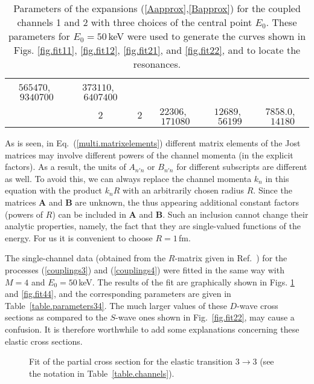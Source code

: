 \documentclass[12pt]{article}
\begin{document}
\begin{table}
\begin{center}
\begin{tabular}{|c|c|c|c|c|c|}
$565470$,\  $9340700$ &
$         373110$,\   $         6407400$\\
  & 2 & 2 &
$          22306    $,\   $         171080$ & %
$12689$,\  $56199$ &
$          7858.0    $,\   $          14180    $\\
\hline
\end{tabular}
\end{center}
\caption{\sf
Parameters of the expansions (\ref{Aapprox},\ref{Bapprox}) for the coupled
channels 1 and 2 with three choices of the central point $E_0$. These
parameters  for $E_0=50$\,keV were used to generate the curves shown in Figs.
\ref{fig.fit11}, \ref{fig.fit12}, \ref{fig.fit21}, and \ref{fig.fit22}, and to
locate the resonances.
}
\label{table.parameters12}
\end{table}

As is seen, in
Eq.~(\ref{multi.matrixelements}) different matrix elements of the Jost matrices
may involve different powers of the channel momenta (in the explicit factors).
As a result, the units of $A_{n'n}$ or $B_{n'n}$ for different subscripts are
different as well. To avoid this,
we can always replace the channel momenta $k_n$ in this equation with the
product $k_nR$ with an arbitrarily chosen radius $R$. Since the matrices
$\bm{A}$ and $\bm{B}$ are unknown, the thus appearing additional constant
factors (powers of $R$) can be included in $\bm{A}$ and $\bm{B}$. Such an
inclusion cannot change their analytic properties, namely, the fact that they
are single-valued functions of the energy. For us it is convenient to choose
$R=1$\,fm.

The single-channel data (obtained from the $R$-matrix given in
Ref.~\cite{PRL59}) for the processes (\ref{couplings3}) and (\ref{couplings4})
were fitted in the same way with $M=4$ and $E_0=50$\,keV. The results of the
fit are graphically shown in Figs. \ref{fig.fit33} and \ref{fig.fit44}, and the
corresponding parameters are given in Table~\ref{table.parameters34}.
The much larger values of these $D$-wave cross sections as compared to the 
$S$-wave ones shown in Fig.~\ref{fig.fit22}, may cause a confusion.
It is therefore worthwhile to add some explanations concerning these elastic 
cross sections. 

\begin{figure}
\centerline{}
\caption{\sf
Fit of the partial cross section for the elastic transition $3\to3$
(see the notation in Table~\ref{table.channels}).
}
\label{fig.fit33}
\end{figure}
\end{document}

